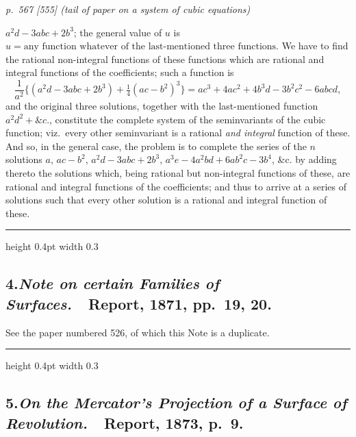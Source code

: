 \documentclass[11pt,a4paper]{book}
\begin{document}

\noindent
\textit{p.~567 [555] (tail of paper on a system of cubic equations)}
\smallskip

\noindent
$a^2 d - 3 abc + 2 b^3$; the general value of $u$ is $u = \text{any function whatever of the
last-mentioned three functions}$.  We have to find the rational non-integral functions
of these functions which are rational and integral functions of the coefficients; such a
function is
\[
\frac{1}{a^2}\{(a^2 d - 3abc + 2b^3) + \tfrac{1}{4}(ac - b^2)^3\}
   = a c^3 + 4 a c^2 + 4 b^3 d - 3 b^2 c^2 - 6 a b c d,
\]
and the original three solutions, together with the last-mentioned function $a^2 d^2 + \&c.$,
constitute the complete system of the seminvariants of the cubic function; viz.\ every
other seminvariant is a rational \emph{and integral} function of these.  And so, in the general
case, the problem is to complete the series of the $n$ solutions $a$, $ac-b^2$, $a^2 d - 3abc + 2b^3$,
$a^3 e - 4a^2 bd + 6ab^2 c - 3b^4$, \&c. by adding thereto the solutions which, being rational but
non-integral functions of these, are rational and integral functions of the coefficients;
and thus to arrive at a series of solutions such that every other solution is a rational
and integral function of these.

\vspace{1em}
\hrule height 0.4pt width 0.3\linewidth
\vspace{1em}

\subsection*{4.\quad \textit{Note on certain Families of Surfaces.}\ \ Report, 1871, pp.~19, 20.}

See the paper numbered 526, of which this Note is a duplicate.

\vspace{1em}
\hrule height 0.4pt width 0.3\linewidth
\vspace{1em}

\subsection*{5.\quad \textit{On the Mercator's Projection of a Surface of Revolution.}\ \ Report, 1873, p.~9.}
\end{document}
